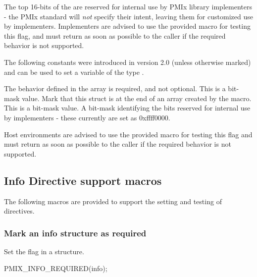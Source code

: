 \adviceimplstart
The top 16-bits of the  are reserved for internal use by \ac{PMIx} library implementers - the \ac{PMIx} standard will \textit{not} specify their intent, leaving them for customized use by implementers. Implementers are advised to use the provided  macro for testing this flag, and must return  as soon as possible to the caller if the required behavior is not supported.
\adviceimplend

The following constants were introduced in version 2.0 (unless otherwise marked) and can be used to set a variable of the type .

\begin{constantdesc}
%
The behavior defined in the  array is required, and not optional. This is a bit-mask value.
%
Mark that this  struct is at the end of an array created by the  macro. This is a bit-mask value.
%
A bit-mask identifying the bits reserved for internal use by implementers - these currently are set as 0xffff0000.
%
\end{constantdesc}

\advicermstart
Host environments are advised to use the provided  macro for testing this flag and must return  as soon as possible to the caller if the required behavior is not supported.
\advicermend


\subsection{Info Directive support macros}

The following macros are provided to support the setting and testing of  directives.

\subsubsection{Mark an info structure as required}

\summary

Set the  flag in a  structure.

\cspecificstart
\begin{codepar}
PMIX_INFO_REQUIRED(info);
\end{codepar}
\cspecificend

